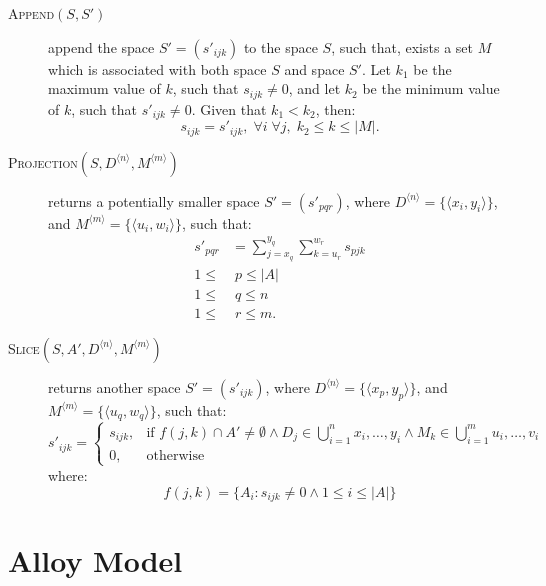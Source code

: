 \documentclass{article}
\begin{document}
\begin{description}
	\item[\textsc{Append}$(S,S')$] append the space
	$S'=\left(s'_{ijk}\right)$ to the space $S$,
		such that, exists a set $M$ which is associated with both space $S$ and
		space $S'$. Let $k_1$ be the maximum value of $k$, such that
		$s_{ijk} \neq 0$, and let $k_2$ be the minimum value of $k$,
		such that $s'_{ijk} \neq 0$. Given that $k_1 < k_2$, then:
		\[
			s_{ijk} = s'_{ijk}, \; \forall i \; \forall j, \; k_2 \leq k \leq |M|.
		\]

	\item[\textsc{Projection}$(S, D^{\langle n \rangle}, M^{\langle m \rangle})$] 
		returns a potentially smaller space $S'=\left(s'_{pqr}\right)$,
		where $D^{\langle n \rangle} = \{\langle x_i, y_i \rangle\}$, and
		$M^{\langle m \rangle} = \{\langle u_i, w_i \rangle\}$,
		such that:
		\begin{align*}
			s'_{pqr} &= \sum_{j=x_q}^{y_q}{\sum_{k=u_r}^{w_r}{s_{pjk}}} \\ 
			1 \leq & \; p \leq |A| \\
			1 \leq & \; q \leq n \\
			1 \leq & \; r \leq m.
		\end{align*}

	\item[\textsc{Slice}$(S, A', D^{\langle n \rangle}, M^{\langle m \rangle})$] 
		returns another space $S'=\left(s'_{ijk}\right)$, 
		where $D^{\langle n \rangle} = \{\langle x_p, y_p \rangle\}$, and
		$M^{\langle m \rangle} = \{\langle u_q, w_q \rangle\}$,
		such that:
		\[
			s'_{ijk} = 
			\begin{cases}
				s_{ijk}, & \text{if } 
					f(j, k) \cap A' \neq \emptyset \land
					D_j \in \bigcup\limits_{i=1}^{n} x_i, \ldots, y_i \land 
					M_k \in \bigcup\limits_{i=1}^{m} u_i, \ldots, v_i \\
				0, & \text{otherwise}
			\end{cases}
		\]
		where:
		\[
			f(j,k) = \{ A_i : s_{ijk} \neq 0 \land 1 \leq i \leq |A| \}
		\]

\end{description}

\section{Alloy Model} %
\label{sec:alloy_model}


\end{document}
